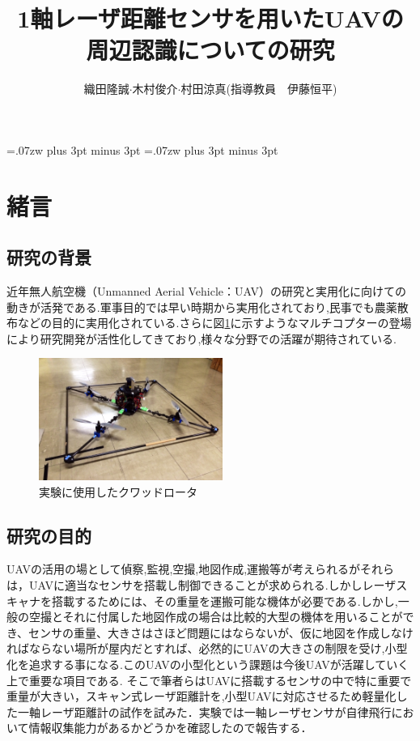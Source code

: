 \documentclass[twocolumn,11pt]{sotsuken_abst}
\title{1軸レーザ距離センサを用いたUAVの周辺認識についての研究}
\author{織田隆誠$\cdot$木村俊介$\cdot$村田涼真(指導教員　伊藤恒平)}
\begin{document}
\maketitle
\thispagestyle{fancy}
\pagestyle{fancy}

\setlength{\baselineskip}{5.6truemm}
\kanjiskip=.07zw plus 3pt minus 3pt
\xkanjiskip=.07zw plus 3pt minus 3pt



\section{緒言}
\subsection{研究の背景}
近年無人航空機（Unmanned Aerial Vehicle：UAV）の研究と実用化に向けての動きが活発である.軍事目的では早い時期から実用化されており,民事でも農薬散布などの目的に実用化されている.さらに図\ref{fig:Quad.JPG}に示すようなマルチコプターの登場により研究開発が活性化してきており,様々な分野での活躍が期待されている.

\begin{figure}[htbp]
  \begin{center}
    \includegraphics[width=60mm]{img/Quad.jpg}
    \end{center}
  \caption{実験に使用したクワッドロータ}
 \label{fig:Quad.JPG}
\end{figure}

\subsection{研究の目的}
UAVの活用の場として偵察,監視,空撮,地図作成,運搬等が考えられるがそれらは，UAVに適当なセンサを搭載し制御できることが求められる.しかしレーザスキャナを搭載するためには、その重量を運搬可能な機体が必要である.しかし,一般の空撮とそれに付属した地図作成の場合は比較的大型の機体を用いることができ、センサの重量、大きさはさほど問題にはならないが、仮に地図を作成しなければならない場所が屋内だとすれば、必然的にUAVの大きさの制限を受け,小型化を追求する事になる.このUAVの小型化という課題は今後UAVが活躍していく上で重要な項目である.
そこで筆者らはUAVに搭載するセンサの中で特に重要で重量が大きい，スキャン式レーザ距離計を,小型UAVに対応させるため軽量化した一軸レーザ距離計の試作を試みた．実験では一軸レーザセンサが自律飛行において情報収集能力があるかどうかを確認したので報告する．
\end{document}
